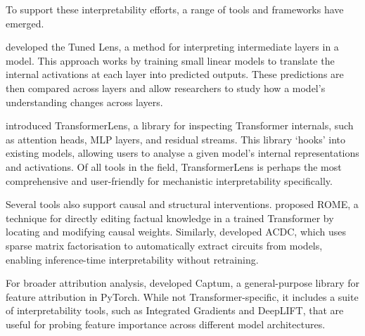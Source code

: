 To support these interpretability efforts, a range of tools and frameworks have emerged.

\citet{belrose2023eliciting} developed the Tuned Lens, a method for interpreting intermediate layers in a model. This approach works by training small linear models to translate the internal activations at each layer into predicted outputs. These predictions are then compared across layers and allow researchers to study how a model's understanding changes across layers.

\citet{nanda2022transformerlens} introduced TransformerLens, a library for inspecting Transformer internals, such as attention heads, MLP layers, and residual streams. This library `hooks' into existing models, allowing users to analyse a given model's internal representations and activations. Of all tools in the field, TransformerLens is perhaps the most comprehensive and user-friendly for mechanistic interpretability specifically.

Several tools also support causal and structural interventions. \citet{meng2022locating} proposed ROME, a technique for directly editing factual knowledge in a trained Transformer by locating and modifying causal weights. Similarly, \citet{conmy2023towards} developed ACDC, which uses sparse matrix factorisation to automatically extract circuits from models, enabling inference-time interpretability without retraining.

For broader attribution analysis, \citet{kokhlikyan2020captum} developed Captum, a general-purpose library for feature attribution in PyTorch. While not Transformer-specific, it includes a suite of interpretability tools, such as Integrated Gradients and DeepLIFT, that are useful for probing feature importance across different model architectures.



